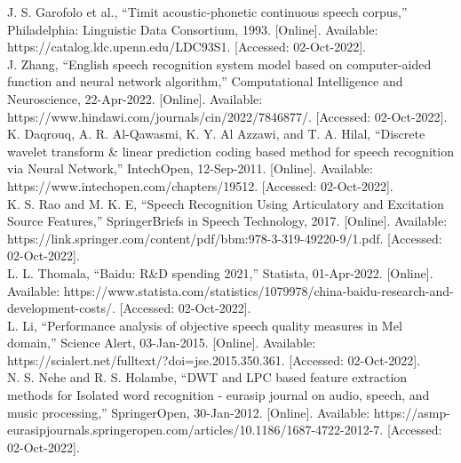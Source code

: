 J. S. Garofolo et al., “Timit acoustic-phonetic continuous speech corpus,” Philadelphia: Linguistic Data Consortium, 1993. [Online]. \newline Available: https://catalog.ldc.upenn.edu/LDC93S1. [Accessed: 02-Oct-2022]. \\
\newline
J. Zhang, “English speech recognition system model based on computer-aided function and neural network algorithm,” Computational Intelligence and Neuroscience, 22-Apr-2022. [Online]. \newline Available: https://www.hindawi.com/journals/cin/2022/7846877/. [Accessed: 02-Oct-2022]. \\
\newline
K. Daqrouq, A. R. Al-Qawasmi, K. Y. Al Azzawi, and T. A. Hilal, “Discrete wavelet transform \& linear prediction coding based method for speech recognition via Neural Network,” IntechOpen, 12-Sep-2011. [Online]. \newline Available: https://www.intechopen.com/chapters/19512. [Accessed: 02-Oct-2022]. \\
\newline
K. S. Rao and M. K. E, “Speech Recognition Using Articulatory and Excitation Source Features,” SpringerBriefs in Speech Technology, 2017. [Online]. \newline Available: https://link.springer.com/content/pdf/bbm:978-3-319-49220-9/1.pdf. [Accessed: 02-Oct-2022]. \\
\newline
L. L. Thomala, “Baidu: R\&D spending 2021,” Statista, 01-Apr-2022. [Online]. \newline Available: https://www.statista.com/statistics/1079978/china-baidu-research-and-development-costs/. [Accessed: 02-Oct-2022]. \\
\newline
L. Li, “Performance analysis of objective speech quality measures in Mel domain,” Science Alert, 03-Jan-2015. [Online]. \newline Available: https://scialert.net/fulltext/?doi=jse.2015.350.361. [Accessed: 02-Oct-2022]. \\
\newline
N. S. Nehe and R. S. Holambe, “DWT and LPC based feature extraction methods for Isolated word recognition - eurasip journal on audio, speech, and music processing,” SpringerOpen, 30-Jan-2012. [Online]. \newline Available: https://asmp-eurasipjournals.springeropen.com/articles/10.1186/1687-4722-2012-7. [Accessed: 02-Oct-2022]. \\
